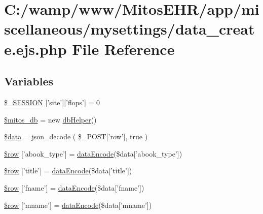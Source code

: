 \hypertarget{miscellaneous_2mysettings_2data__create_8ejs_8php}{\section{\-C\-:/wamp/www/\-Mitos\-E\-H\-R/app/miscellaneous/mysettings/data\-\_\-create.ejs.\-php \-File \-Reference}
\label{miscellaneous_2mysettings_2data__create_8ejs_8php}
}
\subsection*{\-Variables}
\begin{DoxyCompactItemize}
\item 
\hyperlink{miscellaneous_2mysettings_2data__create_8ejs_8php_a99fda8552a3e58235643b79f5af3ded8}{\$\-\_\-\-S\-E\-S\-S\-I\-O\-N} \mbox{[}'site'\mbox{]}\mbox{[}'flops'\mbox{]} = 0
\item 
\hyperlink{miscellaneous_2mysettings_2data__create_8ejs_8php_ab5d961f93efe4e2e8d8374f01dd6c65a}{\$mitos\-\_\-db} = new \hyperlink{classdb_helper}{db\-Helper}()
\item 
\hyperlink{miscellaneous_2mysettings_2data__create_8ejs_8php_a6efc15b5a2314dd4b5aaa556a375c6d6}{\$data} = json\-\_\-decode ( \$\-\_\-\-P\-O\-S\-T\mbox{[}'row'\mbox{]}, true )
\item 
\hyperlink{miscellaneous_2mysettings_2data__create_8ejs_8php_a0d1b6e8abe038ac8d97ac3bcaffc1aec}{\$row} \mbox{[}'abook\-\_\-type'\mbox{]} = \hyperlink{data_exchange_8class_8php_a18220e6e744fcb46d788ed8b03b85f62}{data\-Encode}(\$data\mbox{[}'abook\-\_\-type'\mbox{]})
\item 
\hyperlink{miscellaneous_2mysettings_2data__create_8ejs_8php_a70d36cba6a35524466f2a4c8112c8e4e}{\$row} \mbox{[}'title'\mbox{]} = \hyperlink{data_exchange_8class_8php_a18220e6e744fcb46d788ed8b03b85f62}{data\-Encode}(\$data\mbox{[}'title'\mbox{]})
\item 
\hyperlink{miscellaneous_2mysettings_2data__create_8ejs_8php_a5e241e1f48972b6bd961b356bd5b0b66}{\$row} \mbox{[}'fname'\mbox{]} = \hyperlink{data_exchange_8class_8php_a18220e6e744fcb46d788ed8b03b85f62}{data\-Encode}(\$data\mbox{[}'fname'\mbox{]})
\item 
\hyperlink{miscellaneous_2mysettings_2data__create_8ejs_8php_a59969ea1bfb7b642d6dc27ce674d53c7}{\$row} \mbox{[}'mname'\mbox{]} = \hyperlink{data_exchange_8class_8php_a18220e6e744fcb46d788ed8b03b85f62}{data\-Encode}(\$data\mbox{[}'mname'\mbox{]})

\end{DoxyCompactItemize}
